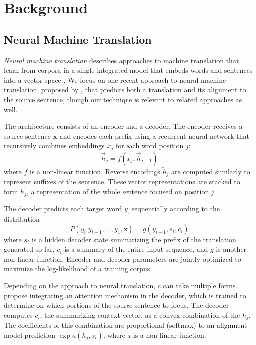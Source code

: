 \section{Background}
\label{sec:background}

\subsection{Neural Machine Translation}
\emph{Neural machine translation} describes approaches to machine translation that
learn from corpora in a single integrated model that embeds words and sentences
into a vector space
\cite{kalchbrenner13emnlp,journals/corr/ChoMGBSB14,journals/corr/SutskeverVL14}.
We focus on one recent approach to neural machine translation, proposed
by , that predicts
both a translation and its alignment to the source sentence, though our technique is relevant to
related approaches as well.

The architecture consists of an encoder and a decoder. The encoder receives a
source sentence $\mathbf{x}$ and encodes each prefix using a recurrent neural
network that recursively combines embeddings $x_j$ for each word position $j$:
\begin{equation}
\overrightarrow{h}_{j} = f(x_{j}, \overrightarrow{h}_{j-1})
\end{equation}
where $f$ is a non-linear function. Reverse encodings $\overleftarrow{h}_j$ are
computed similarly to represent suffixes of the sentence. These vector
representations are stacked to form $h_j$, a representation of the whole
sentence focused on position $j$.

The decoder predicts each target word $y_i$ sequentially according
to the distribution
\begin{equation}
P(y_{i} | y_{i-1}, ..., y_{1}, \mathbf{x}) = g(y_{i-1}, s_i, c_i)
\label{eqn:normalize}
\end{equation}
where $s_i$ is a hidden decoder state summarizing the prefix of the translation
generated so far, $c_i$ is a summary of the entire
input sequence, and $g$ is another non-linear function. Encoder and decoder
parameters are jointly optimized to maximize the log-likelihood of a training
corpus.

Depending on the approach to neural translation, $c$ can take multiple forms.
 propose integrating an attention mechanism
in the decoder, which is trained to determine on which portions of the source
sentence to focus. The decoder computes $c_{i}$, the summarizing context
vector, as a convex combination of the $h_{j}$. The coefficients of this
combination are proportional (softmax) to an alignment model prediction $\exp a(h_j,
s_i)$, where $a$ is a non-linear function.

